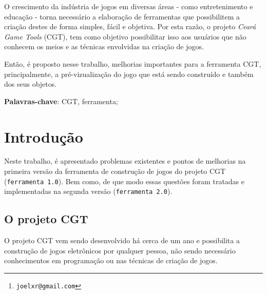 \documentclass[12pt,twoside,openright,a4paper,english,brazil,sumario=tradicional]{abntex2}
\author{Joel Xavier Rocha\thanks{\texttt{joelxr@gmail.com}}}
\begin{document}
\frenchspacing
\imprimircapa
\imprimirfolhaderosto*
%     
% 

\begin{agradecimentos}

\end{agradecimentos}

\setlength{\absparsep}{18pt}
\begin{resumo}
O crescimento da indústria de jogos em diversas áreas - como entretenimento e educação - torna necessário a elaboração de ferramentas que possibilitem a criação destes de forma simples, fácil e objetiva. Por esta razão, o projeto \emph{Ceará Game Tools} (CGT), tem como objetivo possibilitar isso aos usuários que não conhecem os meios e as técnicas envolvidas na criação de jogos.

Então, é proposto nesse trabalho, melhorias importantes para a ferramenta CGT, principalmente, a pré-vizualização do jogo que está sendo construído e também dos seus objetos.

\vspace{\onelineskip}
\noindent
\textbf{Palavras-chave}: CGT, ferramenta;
\end{resumo}

\listoffigures*
\cleardoublepage

\listoftables*
\cleardoublepage

\tableofcontents*
\cleardoublepage

\textual

\chapter{Introdução} %
\label{chap:introducao}

Neste trabalho, é apresentado problemas existentes e pontos de melhorias na primeira versão da ferramenta de construção de jogos do projeto CGT (\texttt{ferramenta 1.0}). Bem como, de que modo essas questões foram tratadas e implementadas na segunda versão (\texttt{ferramenta 2.0}).

\section{O projeto CGT}
O projeto CGT vem sendo desenvolvido há cerca de um ano e possibilita a construção de jogos eletrônicos por qualquer pessoa, não sendo necessário conhecimentos em programação ou nas técnicas de criação de jogos.
\end{document}
